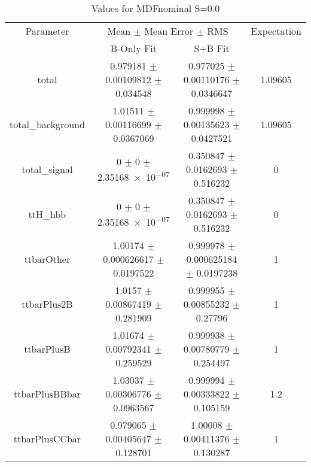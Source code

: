 \begin{table}
\centering
\caption{Values for MDFnominal S=0.0}
\begin{tabular}{cccc}
\toprule
Parameter & \multicolumn{2}{c}{Mean $\pm$ Mean Error $\pm$ RMS} & Expectation\\
 & B-Only Fit & S+B Fit & \\
\midrule
total & \num{0.979181} $\pm$ \num{0.00109812} $\pm$ \num{0.034548} & \num{0.977025} $\pm$ \num{0.00110176} $\pm$ \num{0.0346647} & \num{1.09605}\\
total\_background & \num{1.01511} $\pm$ \num{0.00116699} $\pm$ \num{0.0367069} & \num{0.999998} $\pm$ \num{0.00135623} $\pm$ \num{0.0427521} & \num{1.09605}\\
total\_signal & \num{0} $\pm$ \num{0} $\pm$ \num{2.35168e-07} & \num{0.350847} $\pm$ \num{0.0162693} $\pm$ \num{0.516232} & \num{0}\\
ttH\_hbb & \num{0} $\pm$ \num{0} $\pm$ \num{2.35168e-07} & \num{0.350847} $\pm$ \num{0.0162693} $\pm$ \num{0.516232} & \num{0}\\
ttbarOther & \num{1.00174} $\pm$ \num{0.000626617} $\pm$ \num{0.0197522} & \num{0.999978} $\pm$ \num{0.000625184} $\pm$ \num{0.0197238} & \num{1}\\
ttbarPlus2B & \num{1.0157} $\pm$ \num{0.00867419} $\pm$ \num{0.281909} & \num{0.999955} $\pm$ \num{0.00855232} $\pm$ \num{0.27796} & \num{1}\\
ttbarPlusB & \num{1.01674} $\pm$ \num{0.00792341} $\pm$ \num{0.259529} & \num{0.999938} $\pm$ \num{0.00780779} $\pm$ \num{0.254497} & \num{1}\\
ttbarPlusBBbar & \num{1.03037} $\pm$ \num{0.00306776} $\pm$ \num{0.0963567} & \num{0.999994} $\pm$ \num{0.00333822} $\pm$ \num{0.105159} & \num{1.2}\\
ttbarPlusCCbar & \num{0.979065} $\pm$ \num{0.00405647} $\pm$ \num{0.128701} & \num{1.00008} $\pm$ \num{0.00411376} $\pm$ \num{0.130287} & \num{1}\\
\bottomrule
\end{tabular}
\end{table}